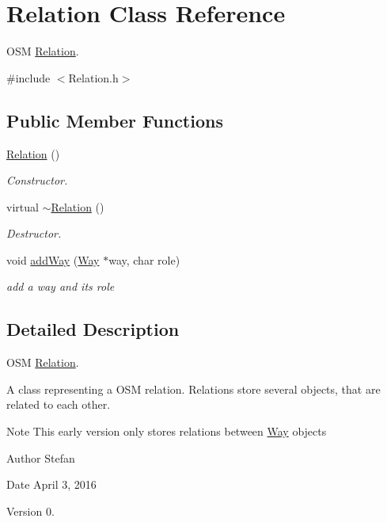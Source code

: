 \hypertarget{classRelation}{\section{Relation Class Reference}
\label{classRelation}
}


O\-S\-M \hyperlink{classRelation}{Relation}.  




{\ttfamily \#include $<$Relation.\-h$>$}

\subsection*{Public Member Functions}
\begin{DoxyCompactItemize}
\item 
\hyperlink{classRelation_a55f2c9d5ae6413cb72c114e583e359ef}{Relation} ()
\begin{DoxyCompactList}\small\item\em Constructor. \end{DoxyCompactList}\item 
virtual \hyperlink{classRelation_ad8bc5c349f9d98b15972fd0b09f341cc}{$\sim$\-Relation} ()
\begin{DoxyCompactList}\small\item\em Destructor. \end{DoxyCompactList}\item 
void \hyperlink{classRelation_ada952e2d9743075b92da916629050733}{add\-Way} (\hyperlink{classWay}{Way} $\ast$way, char role)
\begin{DoxyCompactList}\small\item\em add a way and its role \end{DoxyCompactList}\end{DoxyCompactItemize}


\subsection{Detailed Description}
O\-S\-M \hyperlink{classRelation}{Relation}. 

A class representing a O\-S\-M relation. Relations store several objects, that are related to each other.

\begin{DoxyNote}{Note}
This early version only stores relations between \hyperlink{classWay}{Way} objects
\end{DoxyNote}
\begin{DoxyAuthor}{Author}
Stefan 
\end{DoxyAuthor}
\begin{DoxyDate}{Date}
April 3, 2016 
\end{DoxyDate}
\begin{DoxyVersion}{Version}
0. 
\end{DoxyVersion}


